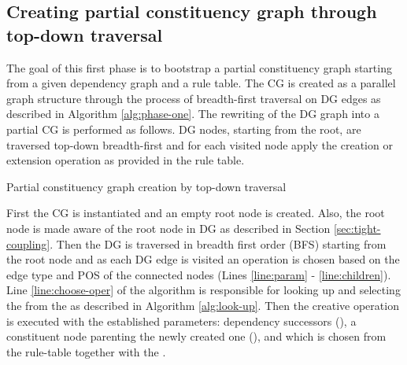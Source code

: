 \subsection{Creating partial constituency graph through top-down traversal}
\label{sec:first-phase}
    The goal of this first phase is to bootstrap a partial constituency graph starting from a given dependency graph and a rule table. The CG is created as a parallel graph structure through the process of breadth-first traversal on DG edges as described in Algorithm \ref{alg:phase-one}. The rewriting of the DG graph into a partial CG is performed as follows. DG nodes, starting from the root, are traversed top-down breadth-first and for each visited node apply the creation or extension operation as provided in the rule table. 

    \begin{algorithm}[!ht]
    	\caption{Partial constituency graph creation by top-down traversal}
    	\label{alg:phase-one}
    \end{algorithm}

    First the CG is instantiated and an empty root node is created. Also, the root node is made aware of the root node in DG as described in Section \ref{sec:tight-coupling}. Then the DG is traversed in breadth first order (BFS) starting from the root node and as each DG edge is visited an operation is chosen based on the edge type and POS of the connected nodes (Lines \ref{line:param} - \ref{line:children}). Line \ref{line:choose-oper} of the algorithm is responsible for looking up and selecting the \operation from the \rt as described in Algorithm \ref{alg:look-up}. Then the creative operation is executed with the established parameters: dependency successors (\Children), a constituent node parenting the newly created one (\cgPointer), and \elementType which is chosen from the rule-table together with the \operation. %
 
